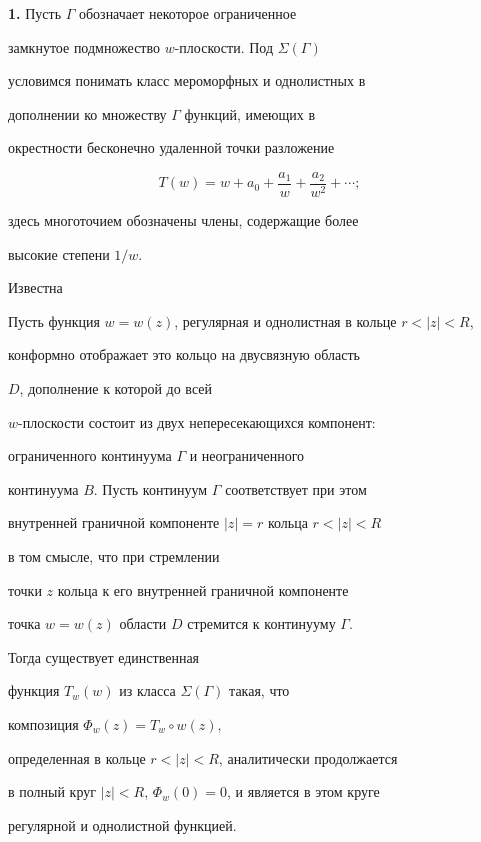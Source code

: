 \maketitle


\label{begin}





{\bf 1.} Пусть $\Gamma$ обозначает некоторое ограниченное


замкнутое подмножество $w$-плоскости. Под $\Sigma(\Gamma)$


условимся понимать класс мероморфных и однолистных в


дополнении ко множеству $\Gamma$ функций, имеющих в


окрестности бесконечно удаленной точки разложение


$$


T(w)=w+a_{0}+\frac{a_{1}}{w}+\frac{a_{2}}{w^{2}}+\dotsb;


$$


здесь многоточием обозначены члены, содержащие более


высокие степени $1/w$.





Известна





\begin{thm}


Пусть функция $w=w(z)$, регулярная и однолистная в кольце $r<|z|<R$, 


конформно отображает это кольцо на двусвязную область 


$D$, дополнение к которой до всей


$w$-плоскости состоит из двух непересекающихся компонент:


ограниченного континуума $\Gamma$ и неограниченного 


континуума $B$. Пусть континуум $\Gamma$ соответствует при этом


внутренней граничной компоненте $|z|=r$ кольца $r<|z|<R$


в том смысле, что при стремлении


точки $z$ кольца к его внутренней граничной компоненте


точка $w=w(z)$ области $D$ стремится к континууму $\Gamma$.





Тогда существует единственная 


функция $T_{w}(w)$ из класса $\Sigma(\Gamma)$ такая, что


композиция $\Phi_{w}(z)=T_{w}\circ w(z),$


определенная в кольце $r<|z|<R$, аналитически продолжается


в полный круг $|z|<R$, $\Phi_{w}(0)=0$, и является в этом круге


регулярной и однолистной функцией.   


\end{thm}





